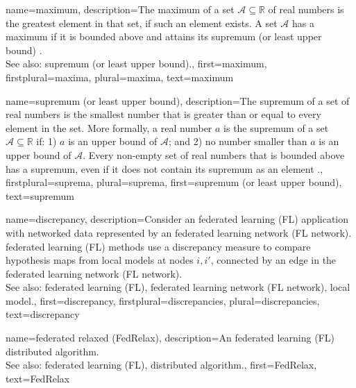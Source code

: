 {
{name={maximum},
	description={The maximum of a set $\mathcal{A} \subseteq \mathbb{R}$ 
     		of real numbers is the greatest element in that set, if such an element exists. A set $\mathcal{A}$ 
     		has a maximum if it is bounded above and attains its supremum (or least upper bound) \cite[Sec.~1.4]{RudinBookPrinciplesMatheAnalysis}.
				\\ 
		See also: supremum (or least upper bound).},
 	first={maximum},
 	firstplural={maxima},
 	plural={maxima},
 	text={maximum}
}

{name={supremum (or least upper bound)},
	description={The supremum of a set of real numbers is 
		the smallest number that is greater than or equal to every element in the set. More formally, a 
		real number $a$ is the supremum of a set $\mathcal{A} \subseteq \mathbb{R}$ if: 1) $a$ 
		is an upper bound of $\mathcal{A}$; and 2) no number smaller than $a$ is an upper bound of $\mathcal{A}$. 
		Every non-empty set of real numbers that is bounded above has a supremum, even if it does 
		not contain its supremum as an element \cite[Sec.~1.4]{RudinBookPrinciplesMatheAnalysis}.},
	firstplural={suprema}, 
  	plural={suprema},
	first={supremum (or least upper bound)},
	text={supremum}
}

{name={discrepancy},
	description={Consider an federated learning (FL) application with networked data 
		represented by an federated learning network (FL network). federated learning (FL) methods use a discrepancy measure 
		to compare hypothesis maps from local models at nodes $i,i'$, 
		connected by an edge in the federated learning network (FL network).
					\\ 
		See also: federated learning (FL), federated learning network (FL network), local model.},
	first={discrepancy},
	firstplural={discrepancies}, 
  	plural={discrepancies}, 
	text={discrepancy}
}

{name={federated relaxed (FedRelax)},
	description={An federated learning (FL) distributed algorithm. 
		\\ 
		See also: federated learning (FL), distributed algorithm.},
	first={FedRelax},
	text={FedRelax}
} 

}

